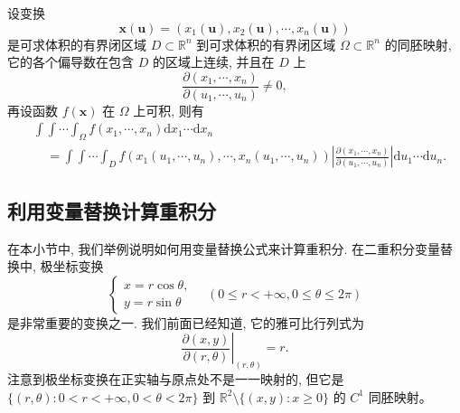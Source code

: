 \documentclass[UTF8,12pt,a4paper,fontset=fandol]{ctexart}
\begin{document}
\begin{theorem}\label{course-theorem-15-4-3}\quad 设变换
\[
  \boldsymbol x(\boldsymbol u)=(x_1(\boldsymbol u),x_2(\boldsymbol u),\cdots,x_n(\boldsymbol u))
\]
是可求体积的有界闭区域 $D\subset\mathbb R^n$ 到可求体积的有界闭区域 $\Omega\subset\mathbb R^n$ 的同胚映射, 它的各个偏导数在包含 $D$ 的区域上连续, 并且在 $D$ 上
\[
  \frac{\partial(x_1,\cdots,x_n)}{\partial(u_1,\cdots,u_n)}\ne0,
\]
再设函数 $f(\boldsymbol x)$ 在 $\Omega$ 上可积, 则有
\[
\begin{aligned}
  &\int\!\!\int\cdots\int_\Omega f(x_1,\cdots,x_n)\mathrm dx_1\cdots\mathrm dx_n\\
  &\quad=\int\!\!\int\cdots\int_D
  f(x_1(u_1,\cdots,u_n),\cdots,x_n(u_1,\cdots,u_n))
  \left|\frac{\partial(x_1,\cdots,x_n)}{\partial(u_1,\cdots,u_n)}\right|
  \mathrm du_1\cdots\mathrm du_n.
\end{aligned}
\]

\end{theorem}
\subsection{利用变量替换计算重积分}

在本小节中, 我们举例说明如何用变量替换公式来计算重积分. 在二重积分变量替换中, 极坐标变换
\[
  \begin{cases}
    x=r\cos\theta,\\
    y=r\sin\theta
  \end{cases}
  \quad(0\leqslant r<+\infty,0\leqslant\theta\leqslant2\pi)
\]
是非常重要的变换之一. 我们前面已经知道, 它的雅可比行列式为
\[
  \left.\frac{\partial(x,y)}{\partial(r,\theta)}\right|_{(r,\theta)}=r.
\]
注意到极坐标变换在正实轴与原点处不是一一映射的, 但它是 $\{(r,\theta):0<r<+\infty,0<\theta<2\pi\}$ 到 $\mathbb R^2\setminus\{(x,y):x\geqslant0\}$ 的 $C^1$ 同胚映射。
\end{document}

